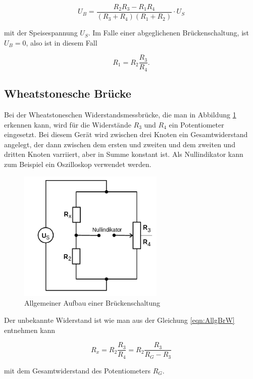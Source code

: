 \begin{equation}
  U_B = \frac{R_2R_3 - R_1R_4}{(R_3+R_4)(R_1+R_2)} \cdot U_S
  \label{eqn:Brs}
\end{equation}

mit der Speisespannung $U_S$.
Im Falle einer abgeglichenen Brückenschaltung, ist $U_B = 0$, also
ist in diesem Fall

\begin{equation}
  R_1 = R_2\frac{R_3}{R_4}.
  \label{eqn:AllgBrW}
\end{equation}


\subsection{Wheatstonesche Brücke}

Bei der Wheatstoneschen Widerstandsmessbrücke, die man in Abbildung
\ref{fig:WheBr} erkennen kann, wird für die
Widerstände $R_3$ und $R_4$ ein Potentiometer eingesetzt.
Bei diesem Gerät wird zwischen
drei Knoten ein Gesamtwiderstand angelegt, der dann zwischen dem ersten und
zweiten und dem zweiten und dritten Knoten varriiert, aber in Summe konstant
ist. Als Nullindikator kann zum Beispiel ein Oszilloskop verwendet werden.

\begin{figure}[h]
  \centering
  \includegraphics[height=6.25cm]{WheBr.png}
  \caption{Allgemeiner Aufbau einer Brückenschaltung}
  \label{fig:WheBr}
\end{figure}

Der unbekannte Widerstand ist wie man aus der Gleichung
\eqref{eqn:AllgBrW} entnehmen kann

\begin{equation}
  R_x = R_2\frac{R_3}{R_4} = R_2\frac{R_3}{R_G - R_3}
\end{equation}

mit dem Gesamtwiderstand des Potentiometers $R_G$.


